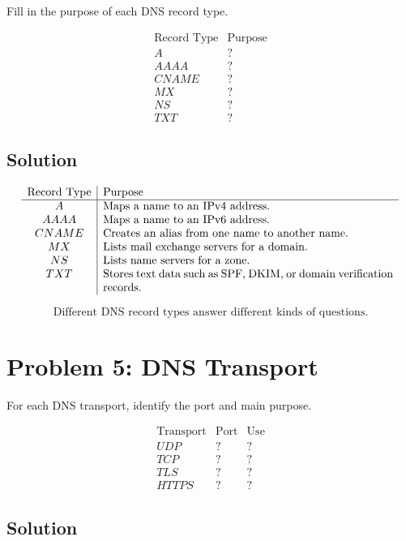 \documentclass[12pt]{article}
\begin{document}
Fill in the purpose of each DNS record type.

\[
\begin{array}{c|c}
\text{Record Type} & \text{Purpose} \\
\hline
A & ? \\
AAAA & ? \\
CNAME & ? \\
MX & ? \\
NS & ? \\
TXT & ?
\end{array}
\]

\subsection*{Solution}

\[
\begin{array}{c|p{9cm}}
\text{Record Type} & \text{Purpose} \\
\hline
A & Maps a name to an IPv4 address. \\
AAAA & Maps a name to an IPv6 address. \\
CNAME & Creates an alias from one name to another name. \\
MX & Lists mail exchange servers for a domain. \\
NS & Lists name servers for a zone. \\
TXT & Stores text data such as SPF, DKIM, or domain verification records.
\end{array}
\]

\[
\boxed{\text{Different DNS record types answer different kinds of questions.}}
\]

\section*{Problem 5: DNS Transport}

For each DNS transport, identify the port and main purpose.

\[
\begin{array}{c|c|c}
\text{Transport} & \text{Port} & \text{Use} \\
\hline
UDP & ? & ? \\
TCP & ? & ? \\
TLS & ? & ? \\
HTTPS & ? & ?
\end{array}
\]

\subsection*{Solution}
\end{document}
